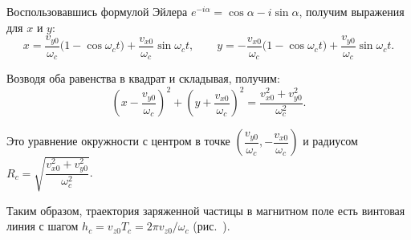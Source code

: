 Воспользовавшись формулой Эйлера \( e^{-i\alpha} = \cos\alpha - i\sin\alpha \),
получим выражения для \( x \) и \( y \):
\[
  x = \frac{v_{y0}}{\omega_c} \Big( 1 - \cos\omega_c t \Big) +
    \frac{v_{x0}}{\omega_c}\sin\omega_c t, \qquad
  y = -\frac{v_{x0}}{\omega_c} \Big( 1 - \cos\omega_c t \Big) +
    \frac{v_{y0}}{\omega_c}\sin\omega_c t.
\]

Возводя оба равенства в квадрат и складывая, получим:
\[
  \left( x - \frac{v_{y0}}{\omega_c} \right)^2 +
    \left( y + \frac{v_{x0}}{\omega_c} \right)^2 =
    \frac{v_{x0}^2 + v_{y0}^2}{\omega_c^2}.
\]

Это уравнение окружности с центром в точке
\(
  \left(
    \dfrac{v_{y0}}{\omega_c}, -\dfrac{v_{x0}}{\omega_c}
  \right)
\)
и радиусом \( R_c = \sqrt{\dfrac{v_{x0}^2 + v_{y0}^2}{\omega_c^2}} \).

Таким образом, траектория заряженной частицы в магнитном поле есть винтовая
линия с шагом \( h_c = v_{z0}T_c = 2\pi v_{z0} / \omega_c \) (рис.~).

